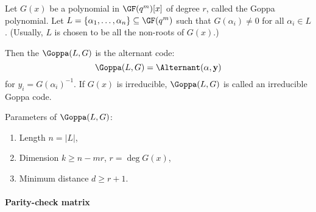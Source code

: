 \documentclass[a4paper, 11pt, openany]{book}
\begin{document}
Let $G(x)$ be a polynomial in $\GF(q^m)[x]$ of degree $r$, called the Goppa polynomial. Let $L = \{ \alpha_1, \dots, \alpha_n \} \subseteq \GF(q^m)$ such that $G(\alpha_i) \ne 0$ for all $\alpha_i \in L$. (Usually, $L$ is chosen to be all the non-roots of $G(x)$.)

Then the  $\Goppa(L,G)$ is the alternant code:
\[
	\Goppa(L,G) = \Alternant({\bf \alpha}, {\bf y})
\]
for $y_i = G(\alpha_i)^{-1}$. If $G(x)$ is irreducible, $\Goppa(L,G)$ is called an irreducible Goppa code.

Parameters of $\Goppa(L,G)$:
\begin{enumerate}
	\item Length $n = |L|$,

	\item Dimension $k \ge n - mr$, $r = \deg G(x)$,

	\item Minimum distance $d \ge r + 1$.
\end{enumerate}





\paragraph{Parity-check matrix}
\end{document}
